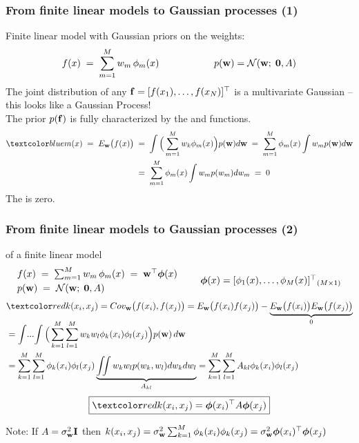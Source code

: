\begin{frame}
\frametitle{From finite linear models to Gaussian processes (1)}
Finite linear model with Gaussian priors on the weights:
%
\[
f(x)\;=\;\sum_{m=1}^M w_m\,\phi_m(x) {\hspace{2cm}} 
p(\mathbf w)=\mathcal{N}(\mathbf w;\; \mathbf{0}, A)
\]
%
The joint distribution of any $\mathbf f=[f(x_1),\ldots,f(x_N)]^\top$ is a
multivariate Gaussian -- this looks like a Gaussian Process!\\[1ex]

The prior $p(\mathbf f)$ is fully characterized by the  and  
functions.
%
\begin{align*}
\Blue{m(x)\;=\;E_\bfw\big(f(x)\big)}
&\;=\;\int\Big(\sum_{m=1}^M w_k\phi_m(x)\Big) p(\bfw) d\bfw
\;=\;\sum_{m=1}^M \phi_m(x)\int w_m p(\bfw) d \bfw\\
&\;=\;\sum_{m=1}^M \phi_m(x)\int w_m p(w_m) dw_m\;=\;0
\end{align*}
The  is zero.
 
\end{frame}


\begin{frame}
\frametitle{From finite linear models to Gaussian processes (2)}

 of a finite linear model
%
\[
\begin{array}{l}
f(x)\;=\;\sum_{m=1}^M w_m\,\phi_m(x)\;=\;\mathbf w^\top\boldsymbol{\phi}(x)\\[1mm]
p(\mathbf w)\;=\;\mathcal{N}(\mathbf w;\; \mathbf{0}, A)
\end{array}
{\; \; \; \; \; }
\begin{array}{lr}
\boldsymbol{\phi}(x) = [\phi_1(x),\ldots,\phi_M(x)]^\top \!\!\! & \!\!\! _{(M \times 1)}
\end{array}
\]
%
%
\begin{align*}
&\Red{k(x_i, x_j)=Cov_\bfw \big(f(x_i), f(x_j)\big)}=E_\bfw\big(f(x_i)f(x_j)\big)
 -\underbrace{E_\bfw\big(f(x_i)\big)E_\bfw\big(f(x_j)\big)}_{0}\\[-3mm]
&=\int\!...\!\int\Big(\sum_{k=1}^M\sum_{l=1}^M w_kw_l\phi_k(x_i)\phi_l(x_j)\Big)
 p(\bfw)\,d\bfw\\
&=\sum_{k=1}^M\sum_{l=1}^M \phi_k(x_i)\phi_l(x_j) 
\underbrace{\iint w_kw_l p(w_k, w_l) dw_kdw_l}_{A_{kl}}
= \sum_{k=1}^M\sum_{l=1}^M A_{kl}\phi_k(x_i)\phi_l(x_j)
\end{align*}
%
\[
\boxed{\Red{k(x_i,x_j)}=\bphi(x_i)^\top A \bphi(x_j)}
\]
%

Note: If $A=\sigma_\mathbf w^2 \mathbf I$ then 
$k(x_i,x_j)=\sigma_\mathbf w^2 \sum_{k=1}^M \phi_k(x_i)\phi_k(x_j)=\sigma_\mathbf w^2\boldsymbol{\phi}(x_i)^\top\boldsymbol{\phi}(x_j)$

\end{frame}


